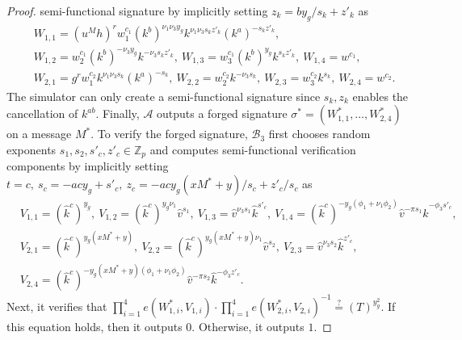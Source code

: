 \documentclass[11pt,letterpaper]{article}
\newcommand{\Z}{\mathbb{Z}}
\newcommand{\mc}[1]{\mathcal{#1}}
\begin{document}
\begin{proof}
semi-functional signature by implicitly setting $z_k = b y_g / s_k + z'_k$ as
    \begin{align*}
    &   W_{1,1} = (u^M h)^r w_1^{c_1} (k^b)^{\nu_1 \nu_3 y_g}
                  k^{\nu_1 \nu_3 s_k z'_k} (k^a)^{-s_k z'_k},~ \\
    &   W_{1,2} = w_2^{c_1} (k^b)^{-\nu_3 y_g} k^{-\nu_3 s_k z'_k},~
        W_{1,3} = w_3^{c_1} (k^b)^{y_g} k^{s_k z'_k},~
        W_{1,4} = w^{c_1}, \\
    &   W_{2,1} = g^r w_1^{c_2} k^{\nu_1 \nu_3 s_k} (k^a)^{-s_k},~
        W_{2,2} = w_2^{c_2} k^{-\nu_3 s_k},~
        W_{2,3} = w_3^{c_2} k^{s_k},~
        W_{2,4} = w^{c_2}.
    \end{align*}
The simulator can only create a semi-functional signature since $s_k, z_k$
enables the cancellation of $k^{ab}$. Finally, $\mc{A}$ outputs a forged
signature $\sigma^* = (W_{1,1}^*, \ldots, W_{2,4}^*)$ on a message $M^*$. To
verify the forged signature, $\mc{B}_3$ first chooses random exponents $s_1,
s_2, s'_c, z'_c \in \Z_p$ and computes semi-functional verification
components by implicitly setting
    $t = c,~ s_c = -ac y_g + s'_c,~
    z_c = -ac y_g (xM^*+y)/s_c + z'_c/s_c$
as
    \begin{align*}
    &   V_{1,1} = (\hat{k}^c)^{y_g},~
        V_{1,2} = (\hat{k}^c)^{y_g \nu_1} \hat{v}^{s_1},~
        V_{1,3} = \hat{v}^{\nu_3 s_1} \hat{k}^{s'_c},~
        V_{1,4} = (\hat{k}^c)^{-y_g (\phi_1 + \nu_1 \phi_2)} \hat{v}^{-\pi s_1}
                  \hat{k}^{-\phi_3 s'_c}, \\
    &   V_{2,1} = (\hat{k}^c)^{y_g (xM^*+y)},~
        V_{2,2} = (\hat{k}^c)^{y_g (xM^*+y) \nu_1} \hat{v}^{s_2},~
        V_{2,3} = \hat{v}^{\nu_3 s_2} \hat{k}^{z'_c},~ \\
    &   V_{2,4} = (\hat{k}^c)^{-y_g (xM^*+y) (\phi_1 + \nu_1 \phi_2)}
                  \hat{v}^{-\pi s_2} \hat{k}^{-\phi_3 z'_c}.
    \end{align*}
Next, it verifies that
    $\prod_{i=1}^4 e(W_{1,i}^*, V_{1,i}) \cdot \prod_{i=1}^4 e(W_{2,i}^*, V_{2,i})^{-1}
    \stackrel{?}{=} (T)^{y_g^2}.$
If this equation holds, then it outputs $0$. Otherwise, it outputs $1$.


\end{proof}
\end{document}

